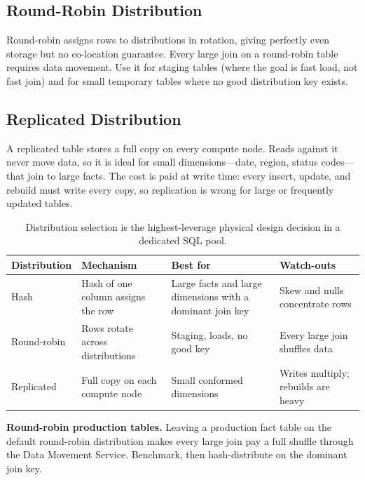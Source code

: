 \subsection{Round-Robin Distribution}
Round-robin assigns rows to distributions in rotation, giving perfectly even storage but no co-location guarantee. Every large join on a round-robin table requires data movement. Use it for staging tables (where the goal is fast load, not fast join) and for small temporary tables where no good distribution key exists.

\subsection{Replicated Distribution}
A replicated table stores a full copy on every compute node. Reads against it never move data, so it is ideal for small dimensions---date, region, status codes---that join to large facts. The cost is paid at write time: every insert, update, and rebuild must write every copy, so replication is wrong for large or frequently updated tables.

\begin{table}[H]
\centering
\small
\begin{tabular}{@{}p{2.6cm}p{4.4cm}p{3.4cm}p{3.2cm}@{}}
\toprule
\textbf{Distribution} & \textbf{Mechanism} & \textbf{Best for} & \textbf{Watch-outs} \\
\midrule
Hash & Hash of one column assigns the row & Large facts and large dimensions with a dominant join key & Skew and nulls concentrate rows \\
Round-robin & Rows rotate across distributions & Staging, loads, no good key & Every large join shuffles data \\
Replicated & Full copy on each compute node & Small conformed dimensions & Writes multiply; rebuilds are heavy \\
\bottomrule
\end{tabular}
\caption{Distribution selection is the highest-leverage physical design decision in a dedicated SQL pool.}
\label{tab:ch5-distributions}
\end{table}

\begin{pitfall}
\textbf{Round-robin production tables.} Leaving a production fact table on the default round-robin distribution makes every large join pay a full shuffle through the Data Movement Service. Benchmark, then hash-distribute on the dominant join key.
\end{pitfall}

